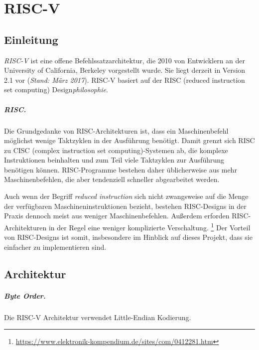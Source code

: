 \chapter{RISC-V} %
\label{RISC-V} %

\section{Einleitung}
\emph{RISC-V} ist eine offene Befehlssatzarchitektur, die 2010 von Entwicklern an der University of California, Berkeley vorgestellt wurde. Sie liegt derzeit in Version 2.1 vor (\textit{Stand: März 2017}). RISC-V basiert auf der RISC (reduced instruction set computing) Design\textit{philosophie}.

\paragraph{RISC.} Die Grundgedanke von RISC-Architekturen ist, dass ein Maschinenbefehl möglichst wenige Taktzyklen in der Ausführung benötigt. Damit grenzt sich RISC zu CISC (complex instruction set computing)-Systemen ab, die komplexe Instruktionen beinhalten und zum Teil viele Taktzyklen zur Ausführung benötigen können. RISC-Programme bestehen daher üblicherweise aus mehr Maschinenbefehlen, die aber tendenziell schneller abgearbeitet werden.

Auch wenn der Begriff \textit{reduced instruction} sich nicht zwangsweise auf die Menge der verfügbaren Maschineninstruktionen bezieht, bestehen RISC-Designs in der Praxis dennoch meist aus weniger Maschinenbefehlen. Außerdem erforden RISC-Architekturen in der Regel eine weniger komplizierte Verschaltung. \footnote{\url{https://www.elektronik-kompendium.de/sites/com/0412281.htm}} Der Vorteil von RISC-Designs ist somit, insbesondere im Hinblick auf dieses Projekt, dass sie einfacher zu implementieren sind.

\section{Architektur}

\paragraph{Byte Order.} Die RISC-V Architektur verwendet Little-Endian Kodierung.

